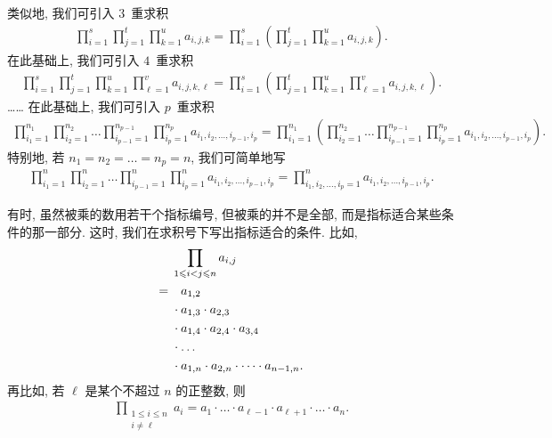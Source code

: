 \documentclass[../libro.tex]{subfiles}
\begin{document}
类似地, 我们可引入 \(3\)~重求积
\begin{align*}
    \prod_{i = 1}^{s} {
        \prod_{j = 1}^{t} {
            \prod_{k = 1}^{u} {
    a_{i,j,k} }}}
    =
    \prod_{i = 1}^{s}
    {\left(
            \prod_{j = 1}^{t} {
                \prod_{k = 1}^{u} {
            a_{i,j,k} }}
    \right)}.
\end{align*}
在此基础上, 我们可引入 \(4\)~重求积
\begin{align*}
    \prod_{i = 1}^{s} {
        \prod_{j = 1}^{t} {
            \prod_{k = 1}^{u} {
                \prod_{\ell = 1}^{v} {
    a_{i,j,k,\ell} }}}}
    =
    \prod_{i = 1}^{s}
    {\left(
            \prod_{j = 1}^{t} {
                \prod_{k = 1}^{u} {
                    \prod_{\ell = 1}^{v} {
            a_{i,j,k,\ell} }}}
    \right)}.
\end{align*}
……
在此基础上, 我们可引入 \(p\)~重求积
\begin{align*}
    \prod_{i_1 = 1}^{n_1} {
        \prod_{i_2 = 1}^{n_2} {
            \dots
            \prod_{i_{p-1} = 1}^{n_{p-1}} {
                \prod_{i_p = 1}^{n_p} {
    a_{i_1,i_2,\dots,i_{p-1},i_p} }}}}
    = \prod_{i_1 = 1}^{n_1}
    {\left(
            \prod_{i_2 = 1}^{n_2} {
                \dots
                \prod_{i_{p-1} = 1}^{n_{p-1}} {
                    \prod_{i_p = 1}^{n_p} {
            a_{i_1,i_2,\dots,i_{p-1},i_p} }}}
    \right)}.
\end{align*}
特别地, 若 \(n_1 = n_2 = \dots = n_p = n\),
我们可简单地写
\begin{align*}
    \prod_{i_1 = 1}^{n} {
        \prod_{i_2 = 1}^{n} {
            \dots
            \prod_{i_{p-1} = 1}^{n} {
                \prod_{i_p = 1}^{n} {
    a_{i_1,i_2,\dots,i_{p-1},i_p} }}}}
    =
    \prod_{i_1,i_2,\dots,i_p = 1}^{n}
    {a_{i_1,i_2,\dots,i_{p-1},i_p}}.
\end{align*}

有时, 虽然被乘的数用若干个指标编号,
但被乘的并不是全部,
而是指标适合某些条件的那一部分.
这时, 我们在求积号下写出指标适合的条件.
比如,
\begin{align*}
    & \prod_{1 \leq i < j \leq n} {a_{i,j}}
    \\
    = {} & \hphantom{{} \cdot {}} a_{1,2}
    \\
    & \cdot a_{1,3} \cdot a_{2,3}
    \\
    & \cdot a_{1,4} \cdot a_{2,4} \cdot a_{3,4}
    \\
    & \cdot
    \dots
    \\
    & \cdot a_{1,n} \cdot a_{2,n}
    \cdot \dots \cdot a_{n-1,n}.
\end{align*}
再比如, 若 \(\ell\) 是某个不超过 \(n\) 的正整数, 则
\begin{align*}
    \prod_{\substack{1 \leq i \leq n \\ i \neq \ell}}
    {a_i}
    = a_1 \cdot \dots \cdot a_{\ell-1}
    \cdot a_{\ell+1} \cdot \dots \cdot a_n.
\end{align*}
\end{document}
